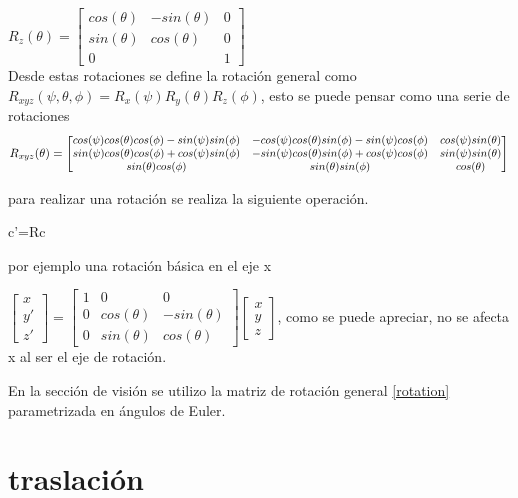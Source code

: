 $R_z(\theta)=\begin{bmatrix}
	cos(\theta)	& -sin(\theta) &0  \\ 
	sin(\theta)	&  cos(\theta)& 0 \\ 
	0	&  & 1 
\end{bmatrix}$\\

Desde estas rotaciones se define la rotación general como $R_{xyz}(\psi,\theta,\phi)=R_x(\psi)R_y(\theta)R_z(\phi)$, esto se puede pensar como una serie de rotaciones
\begin{equation}\label{rotation}
{\small R_{xyz}(\theta)=\begin{bmatrix}
cos(\psi)cos(\theta)cos(\phi)-sin(\psi)sin(\phi)	& -cos(\psi)cos(\theta)sin(\phi) -sin(\psi)cos(\phi) & cos(\psi)sin(\theta)   \\ 
sin(\psi)cos(\theta)cos(\phi)+cos(\psi)sin(\phi) &  -sin(\psi)cos(\theta)sin(\phi) +cos(\psi)cos(\phi) &  sin(\psi)sin(\theta) \\ 
sin(\theta)cos(\phi)	& sin(\theta)sin(\phi) & cos(\theta) 
\end{bmatrix}\\}
\end{equation}


para realizar una rotación se realiza la siguiente operación.


c'=Rc



por ejemplo una rotación básica en el eje x

$\begin{bmatrix}
	x  \\ 
	y' \\ 
	z'
\end{bmatrix} =\begin{bmatrix}
1	& 0 &0  \\ 
0	&  cos(\theta)& -sin(\theta) \\ 
0	& sin(\theta) & cos(\theta) 
\end{bmatrix} \begin{bmatrix}
	x  \\ 
	y \\ 
	z
\end{bmatrix} $, como se puede apreciar, no se afecta x al ser el eje de rotación.


En la sección de visión se utilizo la matriz de rotación general \ref{rotation} parametrizada en ángulos de Euler.

\section{traslación}

